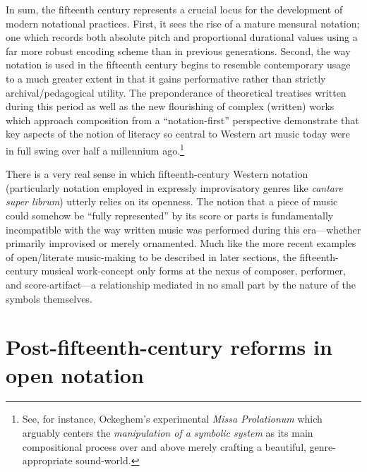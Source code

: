     In sum, the fifteenth century represents a crucial locus for the development of modern notational practices. First, it sees the rise of a mature mensural notation; one which records both absolute pitch and proportional durational values using a far more robust encoding scheme than in previous generations. Second, the way notation is used in the fifteenth century begins to resemble contemporary usage to a much greater extent in that it gains performative rather than strictly archival/pedagogical utility. The preponderance of theoretical treatises written during this period as well as the new flourishing of complex (written) works which approach composition from a ``notation-first'' perspective demonstrate that key aspects of the notion of literacy so central to Western art music today were in full swing over half a millennium ago.\footnote{See, for instance, Ockeghem's experimental \textit{Missa Prolationum} which arguably centers the \textit{manipulation of a symbolic system} as its main compositional process over and above merely crafting a beautiful, genre-appropriate sound-world.} 

    There is a very real sense in which fifteenth-century Western notation (particularly notation employed in expressly improvisatory genres like \textit{cantare super librum}) utterly relies on its openness. The notion that a piece of music could somehow be ``fully represented'' by its score or parts is fundamentally incompatible with the way written music was performed during this era---whether primarily improvised or merely ornamented. Much like the more recent examples of open/literate music-making to be described in later sections, the fifteenth-century musical work-concept only forms at the nexus of composer, performer, and score-artifact---a relationship mediated in no small part by the nature of the symbols themselves.
    

\section{Post-fifteenth-century reforms in open notation}
   
